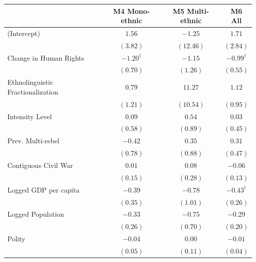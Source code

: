 \documentclass[12pt,]{book}
\let\origtable\table
\let\endorigtable\endtable
\renewenvironment{table}[1][2] {
    \singlespacing
    \expandafter\origtable\expandafter[H]
} {
    \endorigtable
}
\theoremstyle{definition}
\theoremstyle{definition}
\theoremstyle{definition}
\theoremstyle{remark}
\begin{document}
\begin{table}
\begin{center}
\begin{tabular}{l c c c }
\hline
 & M4 Mono-ethnic & M5 Multi-ethnic & M6 All \\
\hline
(Intercept)                       & $1.56$            & $-1.25$   & $1.71$            \\
                                  & $(3.82)$          & $(12.46)$ & $(2.84)$          \\
Change in Human Rights            & $-1.20^{\dagger}$ & $-1.15$   & $-0.99^{\dagger}$ \\
                                  & $(0.70)$          & $(1.26)$  & $(0.55)$          \\
Ethnolinguistic Fractionalization & $0.79$            & $11.27$   & $1.12$            \\
                                  & $(1.21)$          & $(10.54)$ & $(0.95)$          \\
Intensity Level                   & $0.09$            & $0.54$    & $0.03$            \\
                                  & $(0.58)$          & $(0.89)$  & $(0.45)$          \\
Prev. Multi-rebel                 & $-0.42$           & $0.35$    & $0.31$            \\
                                  & $(0.78)$          & $(0.88)$  & $(0.47)$          \\
Contiguous Civil War              & $0.01$            & $0.08$    & $-0.06$           \\
                                  & $(0.15)$          & $(0.28)$  & $(0.13)$          \\
Logged GDP per capita             & $-0.39$           & $-0.78$   & $-0.43^{\dagger}$ \\
                                  & $(0.35)$          & $(1.01)$  & $(0.26)$          \\
Logged Population                 & $-0.33$           & $-0.75$   & $-0.29$           \\
                                  & $(0.26)$          & $(0.70)$  & $(0.20)$          \\
Polity                            & $-0.04$           & $0.00$    & $-0.01$           \\
                                  & $(0.05)$          & $(0.11)$  & $(0.04)$          \\
\hline

\end{tabular}
\end{center}
\end{table}
\end{document}
